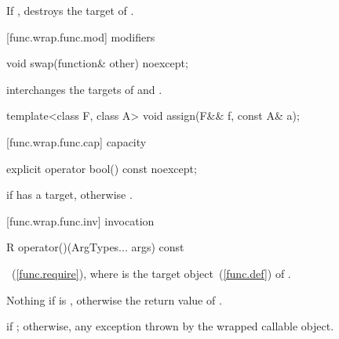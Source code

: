 \begin{itemdescr}
\pnum\effects If , destroys the target of .
\end{itemdescr}

[func.wrap.func.mod]{ modifiers}

%
%
\begin{itemdecl}
void swap(function& other) noexcept;
\end{itemdecl}

\begin{itemdescr}
\pnum\effects interchanges the targets of  and .
\end{itemdescr}

%
%
\begin{itemdecl}
template<class F, class A>
  void assign(F&& f, const A& a);
\end{itemdecl}

\begin{itemdescr}
\pnum\effects {}
\end{itemdescr}

[func.wrap.func.cap]{ capacity}

%
\begin{itemdecl}
explicit operator bool() const noexcept;
\end{itemdecl}

\begin{itemdescr}
\pnum
\returns {} if  has a target, otherwise .
\end{itemdescr}

[func.wrap.func.inv]{ invocation}

%
%
%
\begin{itemdecl}
R operator()(ArgTypes... args) const
\end{itemdecl}

\begin{itemdescr}
\pnum
\effects
{}~(\ref{func.require}),
where  is the target object~(\ref{func.def}) of .

\pnum\returns Nothing if  is , otherwise the
return value of
.

\pnum\throws
{} if ; otherwise, any
exception thrown by the wrapped callable object.
\end{itemdescr}

